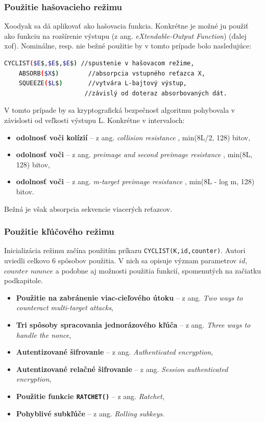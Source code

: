 \subsubsection{Použitie hašovacieho režimu}
Xoodyak sa dá aplikovať ako hašovacia funkcia. Konkrétne je možné ju použiť ako funkciu na rozšírenie výstupu (z ang. \textit{eXtendable-Output Function}) (ďalej \acrshort{xof}). Nominálne, resp. nie bežné použitie by v tomto prípade bolo nasledujúce: 
\begin{lstlisting}[language=bash,mathescape=true]
	CYCLIST($E$,$E$,$E$) //spustenie v hašovacom režime,
 	ABSORB($X$)        //absorpcia vstupného reťazca X,
 	SQUEEZE($L$)       //vytvára L-bajtový výstup, 
	     	          //závislý od doteraz absorbovaných dát.
\end{lstlisting}
V tomto prípade by sa kryptografická bezpečnosť algoritmu pohybovala v závislosti od veľkosti výstupu L. Konkrétne v intervaloch:
\begin{itemize}
	\item{\textbf{odolnosť voči kolízií}} -- z ang. \textit{collision resistance} \cite{cr}, min(8L/2, 128) bitov,
	\item{\textbf{odolnosť voči }} -- z ang. \textit{preimage and second preimage resistance} \cite{pa}, min(8L, 128) bitov,
	\item{\textbf{odolnosť voči}} -- z ang. \textit{m-target preimage resistance} \cite{pa}, min(8L - log m, 128) bitov.
\end{itemize}
Bežná je však absorpcia sekvencie viacerých reťazcov.

\subsubsection{Použitie kľúčového režimu}
Inicializácia režimu začína použitím príkazu \lstinline|CYCLIST(K,id,counter)|. Autori uviedli celkovo 6 spôsobov použitia. V nich sa opisuje význam parametrov $id$, $counter$ $nounce$ a podobne aj možnosti použitia funkcií, spomenutých na začiatku podkapitole.
\begin{itemize}
	\item{\textbf{Použitie na zabránenie viac-cieľového útoku}} -- z ang. \textit{Two ways to counteract multi-target attacks},
	\item{\textbf{Tri spôsoby spracovania jednorázového kľúča}} -- z ang. \textit{Three ways to handle the nonce},
	\item{\textbf{Autentizované šifrovanie}} -- z ang. \textit{Authenticated encryption},
	\item{\textbf{Autentizované relačné šifrovanie}} -- z ang. \textit{Session authenticated encryption},
	\item{\textbf{Použitie funkcie \lstinline|RATCHET()|}} -- z ang. \textit{Ratchet},
	\item{\textbf{Pohyblivé subkľúče}} -- z ang. \textit{Rolling subkeys}.
\end{itemize}


